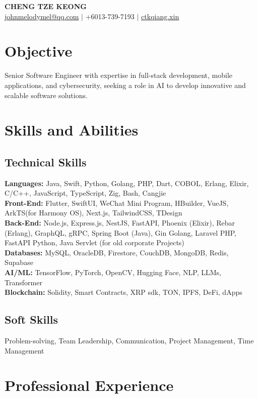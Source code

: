 \documentclass[11pt,a4paper]{article}
\begin{document}
\begin{center}
    {\LARGE\textbf{CHENG TZE KEONG}} \\
    \href{mailto:johnmelodymel@qq.com}{johnmelodymel@qq.com} $\mid$ +6013-739-7193 $\mid$ \href{https://www.ctkqiang.xin}{ctkqiang.xin}
\end{center}

\section*{Objective}
Senior Software Engineer with expertise in full-stack development, mobile applications, and cybersecurity, seeking a role in AI to develop innovative and scalable software solutions.

\section*{Skills and Abilities}
\subsection*{Technical Skills}
\textbf{Languages:} Java, Swift, Python, Golang, PHP, Dart, COBOL, Erlang, Elixir, C/C++, JavaScript, TypeScript, Zig, Bash, Cangjie \\
\textbf{Front-End:} Flutter, SwiftUI, WeChat Mini Program, HBuilder, VueJS, ArkTS(for Harmony OS), Next.js, TailwindCSS, TDesign \\
\textbf{Back-End:} Node.js, Express.js, NestJS, FastAPI, Phoenix (Elixir), Rebar (Erlang), GraphQL, gRPC, Spring Boot (Java), Gin Golang, Laravel PHP, FastAPI Python, Java Servlet (for old corporate Projects) \\
\textbf{Databases:} MySQL, OracleDB, Firestore, CouchDB, MongoDB, Redis, Supabase \\
\textbf{AI/ML:} TensorFlow, PyTorch, OpenCV, Hugging Face, NLP, LLMs, Transformer \\
\textbf{Blockchain:} Solidity, Smart Contracts, XRP sdk, TON, IPFS, DeFi, dApps

\subsection*{Soft Skills}
Problem-solving, Team Leadership, Communication, Project Management, Time Management

\section*{Professional Experience}
\end{document}

